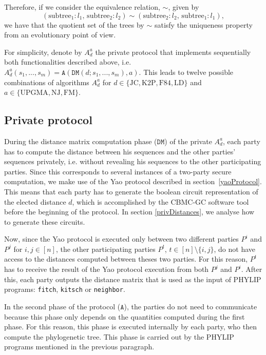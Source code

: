 \begin{itemize}
    Therefore, if we consider the equivalence relation, $\sim$, given by
    \begin{equation*}
    (\text{subtree}_1:l_1,\, \text{subtree}_2:l_2)  \sim (\text{subtree}_2:l_2,\, \text{subtree}_1:l_1),
    \end{equation*}
	we have that the quotient set of the trees by $\sim$ satisfy the uniqueness property from an evolutionary point of view.

   
\end{itemize}

For simplicity, denote by $A_d^a$ the private protocol that implements sequentially both functionalities described above, i.e. $A_d^a(s_1, ... , s_m) = \mathtt{A}( \mathtt{DM}(d; s_1, ..., s_m), a)$. This leads to twelve possible combinations of algorithms $A_d^a$ for $d\in\{\text{JC}, \text{K2P}, \text{F84}, \text{LD}\}$ and $a \in \{\text{UPGMA}, \text{NJ}, \text{FM}\}$.

\subsection{Private protocol}

During the distance matrix computation phase ($\mathtt{DM}$) of the private $A_d^a$, each party has to compute the distance between his sequences and the other parties' sequences privately, i.e. without revealing his sequences to the other participating parties. Since this corresponds to several instances of a two-party secure computation, we make use of the Yao protocol described in section~\ref{yaoProtocol}. This means that each party has to generate the boolean circuit representation of the elected distance $d$, which is accomplished by the CBMC-GC software tool before the beginning of the protocol. In section \ref{privDistances}, we analyse how to generate these circuits.

Now, since the Yao protocol is executed only between two different parties $P^i$ and $P^j$ for $i, j \in[n]$, the other participating parties $P^t$, $t\in[n]\setminus \{i,j\}$, do not have access to the distances computed between theses two parties. For this reason, $P^t$ has to receive the result of the Yao protocol execution from both $P^j$ and $P^i$. After this, each party outputs the distance matrix that is used as the input of PHYLIP programs: \texttt{fitch}, \texttt{kitsch} or \texttt{neighbor}. 

In the second phase of the protocol ($\mathtt{A}$), the parties do not need to communicate because this phase only depends on the quantities computed during the first phase. For this reason, this phase is executed internally by each party, who then compute the phylogenetic tree. This phase is carried out by the PHYLIP programs mentioned in the previous paragraph.

